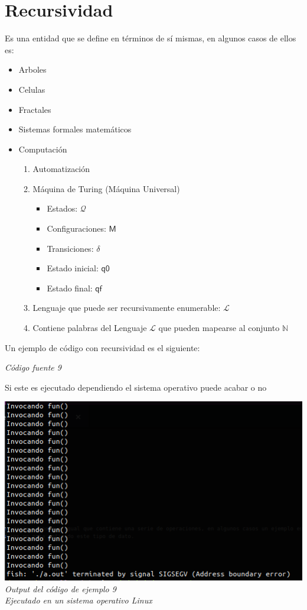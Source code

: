 \documentclass[10pt,executivepaper]{article}
\begin{document}
\section{Recursividad}
Es una entidad que se define en términos de sí mismas, en algunos casos de ellos es:
\begin{itemize}
  \item Arboles
  \item Celulas
  \item Fractales
  \item Sistemas formales matemáticos
  \item Computación
  \begin{enumerate}
    \item Automatización
    \item Máquina de Turing (Máquina Universal)
    \begin{itemize}
      \item Estados: $\mathcal{Q}$
      \item Configuraciones: $\mathsf{M}$
      \item Transiciones: $\delta$
      \item Estado inicial: $\mathsf{q0}$
      \item Estado final: $\mathsf{qf}$
    \end{itemize}
    \item Lenguaje que puede ser recursivamente enumerable: $\mathcal{L}$
    \item Contiene palabras del Lenguaje $\mathcal{L}$ que pueden mapearse al conjunto $\mathbb{N}$
  \end{enumerate}
\end{itemize}
Un ejemplo de código con recursividad es el siguiente:

\begin{center}
\textit{Código fuente 9}\\
\end{center}
Si este es ejecutado dependiendo el sistema operativo puede acabar o no
\begin{center}
\includegraphics[scale=0.5]{screens/screen3.png}\\
\textit{Output del código de ejemplo 9\\Ejecutado en un sistema operativo Linux}
\end{center}
\end{document}
